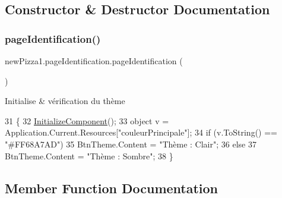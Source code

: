 \subsection{Constructor \& Destructor Documentation}
\mbox{\label{classnewPizza1_1_1pageIdentification_a2c052fba1b9dbd52a6490af85f6edab1}} 
\subsubsection{\texorpdfstring{page\+Identification()}{pageIdentification()}}
{\footnotesize\ttfamily new\+Pizza1.\+page\+Identification.\+page\+Identification (\begin{DoxyParamCaption}{ }\end{DoxyParamCaption})\hspace{0.3cm}{\ttfamily [inline]}}



Initialise \& vérification du thème 


\begin{DoxyCode}
31         \{
32             \hyperlink{classnewPizza1_1_1pageIdentification_adfe48959ae9c294c657f21027deed65f}{InitializeComponent}();
33             \textcolor{keywordtype}{object} v = Application.Current.Resources[\textcolor{stringliteral}{"couleurPrincipale"}];
34             \textcolor{keywordflow}{if} (v.ToString() == \textcolor{stringliteral}{"#FF68A7AD"})
35                 BtnTheme.Content = \textcolor{stringliteral}{"Thème : Clair"};
36             \textcolor{keywordflow}{else}
37                 BtnTheme.Content = \textcolor{stringliteral}{"Thème : Sombre"};
38         \}
\end{DoxyCode}


\subsection{Member Function Documentation}
\mbox{\label{classnewPizza1_1_1pageIdentification_adfe48959ae9c294c657f21027deed65f}} 
